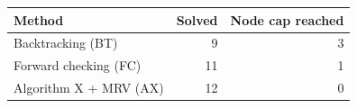\begin{tabular}{lrr}
\toprule
Method & Solved & Node cap reached \\
\midrule
Backtracking (BT) & 9 & 3 \\
Forward checking (FC) & 11 & 1 \\
Algorithm X + MRV (AX) & 12 & 0 \\
\bottomrule
\end{tabular}
